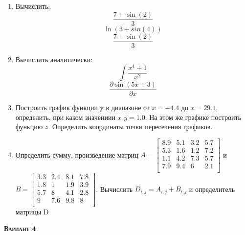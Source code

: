 \begin{enumerate}
\item Вычислить: 
\begin{equation*}\dfrac{7+\sin(2)}{3}              \end{equation*}
\begin{equation*}\ln(3+sin(4))                     \end{equation*}
\begin{equation*}\dfrac{7+\sin(2)}{3}              \end{equation*}

\item Вычислить аналитически: 
 \begin{equation*} \int \dfrac{x^4+1}{x^2} \end{equation*}\begin{equation*} {\dfrac{\partial \sin(5 x +3)}{\partial x}} \end{equation*}
\item Построить график функции y в диапазоне от $x=-4.4$ до $x=29.1$, определить, при каком значениии $x$ $y=1.0$. На этом же графике построить функцию $z $. Определить координаты точки пересечения графиков. \item Определить сумму, произведение матриц $A=\begin{bmatrix}
8.9 &5.1 &3.2 &5.7 \\
5.3 &1.6 &1.2 &7.2 \\
1.1 &4.2 &7.3 &5.7 \\
7.9 &9.4 &6 &2.1 \\
\end{bmatrix}
$ и $B=\begin{bmatrix}
3.3 &2.4 &8.1 &7.8 \\
1.8 &1 &1.9 &3.9 \\
5.7 &8 &4.1 &2.8 \\
9 &7.6 &9.8 &8 \\
\end{bmatrix}
$. Вычислить $D_{i,j}=A_{i,j} + B_{i,j}$ и определитель матрицы D
\end{enumerate}
\textsc{\textbf{Вариант 4}}


